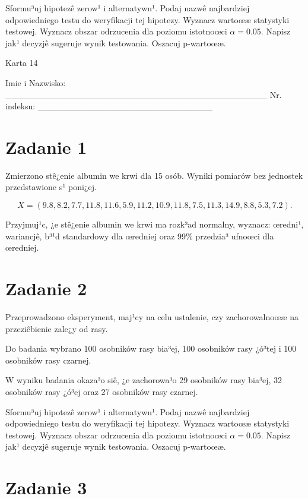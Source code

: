 \documentclass[a4paper,12pt]{article}
\begin{document}
     Sformu³uj hipotezê zerow¹ i alternatywn¹. 
     Podaj nazwê najbardziej odpowiedniego testu do weryfikacji tej hipotezy. 
     Wyznacz wartoœæ statystyki testowej. 
     Wyznacz obszar odrzucenia dla poziomu istotnoœci $\alpha=0.05$. 
     Napisz jak¹ decyzjê sugeruje wynik testowania. 
     Oszacuj p-wartoœæ. \vspace{1cm} 

  \clearpage  Karta  14  

 Imie i Nazwisko: \_\_\_\_\_\_\_\_\_\_\_\_\_\_\_\_\_\_\_\_\_\_\_\_\_\_\_\_\_\_\_\_\_\_\_\_\_\_\_\_\_\_ Nr. indeksu: \_\_\_\_\_\_\_\_\_\_\_\_\_\_\_\_\_\_\_\_\_\_\_\_\_\_\_\_ 
 \section*{Zadanie 1}
     
     Zmierzono stê¿enie albumin we krwi dla 15 osób. 
     Wyniki pomiarów bez jednostek przedstawione s¹ poni¿ej. 
     
     \noindent $$X=(  9.8,  8.2,  7.7, 11.8, 11.6,  5.9, 11.2, 10.9, 11.8,  7.5, 11.3, 14.9,  8.8,  5.3,  7.2 ).$$
     
     Przyjmuj¹c, ¿e stê¿enie albumin we krwi ma rozk³ad normalny, 
     wyznacz: œredni¹, wariancjê, b³¹d standardowy dla œredniej oraz 99\% przedzia³ ufnoœci dla œredniej. \vspace{1cm} 

  \section*{Zadanie 2}
     
  Przeprowadzono eksperyment, maj¹cy na celu ustalenie, czy zachorowalnoœæ na przeziêbienie zale¿y od rasy.
  
  Do badania wybrano 100 osobników rasy bia³ej, 100 osobników rasy ¿ó³tej i 100 osobników rasy czarnej. 
  
  W wyniku badania okaza³o siê, ¿e zachorowa³o 29 osobników rasy bia³ej, 32 osobników rasy ¿ó³ej oraz 27 osobników rasy czarnej. 
  
  Sformu³uj hipotezê zerow¹ i alternatywn¹. 
  Podaj nazwê najbardziej odpowiedniego testu do weryfikacji tej hipotezy. 
  Wyznacz wartoœæ statystyki testowej. 
  Wyznacz obszar odrzucenia dla poziomu istotnoœci $\alpha=0.05$. 
  Napisz jak¹ decyzjê sugeruje wynik testowania. Oszacuj p-wartoœæ. \vspace{1cm} 

  \section*{Zadanie 3}
     
\end{document}
